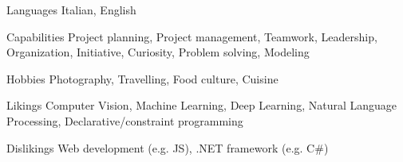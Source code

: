 \begin{minipage}[]{0.4\textwidth}
  \vspace{2.0mm}

  \begin{cvskills}
    \hspace{4.0mm}
    \cvskill
      {Languages}
      {Italian, English}
    
    \cvskill
      {Capabilities}
      {Project planning, Project management, Teamwork, Leadership, Organization, Initiative, Curiosity, Problem solving, Modeling}

    \cvskill
      {Hobbies}
      {Photography, Travelling, Food culture, Cuisine}
  \end{cvskills}
\end{minipage}%
\begin{minipage}[]{0.6\textwidth}
  \hfill
\end{minipage}
\vspace{2.0mm}


\begin{minipage}[]{0.4\textwidth}
  \vspace{2.0mm}

  \begin{cvskills}
    \hspace{10.0mm}
    \cvskill
      {Likings}
      {Computer Vision, Machine Learning, Deep Learning, Natural Language Processing, Declarative/constraint programming}
    
    \cvskill
      {Dislikings}
      {Web development (e.g. JS), .NET framework (e.g. C\#)}
  \end{cvskills}
\end{minipage}%
\begin{minipage}[]{0.6\textwidth}
  \hfill
\end{minipage}
\vspace{4.0mm}
